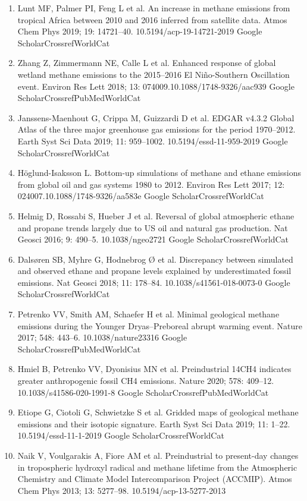 \documentclass[a4paper,12pt]{article}
\begin{document}
{\begin{thebibliography}{}
\begin{enumerate}
    Google ScholarCrossrefWorldCat 
    \item	Lunt MF, Palmer PI, Feng L et al.  An increase in methane emissions from tropical Africa between 2010 and 2016 inferred from satellite data. Atmos Chem Phys 2019; 19: 14721–40. 10.5194/acp-19-14721-2019
    Google ScholarCrossrefWorldCat 
    \item	Zhang Z, Zimmermann NE, Calle L et al.  Enhanced response of global wetland methane emissions to the 2015–2016 El Niño-Southern Oscillation event. Environ Res Lett 2018; 13: 074009.10.1088/1748-9326/aac939
    Google ScholarCrossrefPubMedWorldCat 
    \item	Janssens-Maenhout G, Crippa M, Guizzardi D et al.  EDGAR v4.3.2 Global Atlas of the three major greenhouse gas emissions for the period 1970–2012. Earth Syst Sci Data 2019; 11: 959–1002. 10.5194/essd-11-959-2019
    Google ScholarCrossrefWorldCat 
    \item	Höglund-Isaksson L. Bottom-up simulations of methane and ethane emissions from global oil and gas systems 1980 to 2012. Environ Res Lett 2017; 12: 024007.10.1088/1748-9326/aa583e
    Google ScholarCrossrefWorldCat 
    \item	Helmig D, Rossabi S, Hueber J et al.  Reversal of global atmospheric ethane and propane trends largely due to US oil and natural gas production. Nat Geosci 2016; 9: 490–5. 10.1038/ngeo2721
    Google ScholarCrossrefWorldCat 
    \item	Dalsøren SB, Myhre G, Hodnebrog Ø et al.  Discrepancy between simulated and observed ethane and propane levels explained by underestimated fossil emissions. Nat Geosci 2018; 11: 178–84. 10.1038/s41561-018-0073-0
    Google ScholarCrossrefWorldCat 
    \item	Petrenko VV, Smith AM, Schaefer H et al.  Minimal geological methane emissions during the Younger Dryas–Preboreal abrupt warming event. Nature 2017; 548: 443–6. 10.1038/nature23316
    Google ScholarCrossrefPubMedWorldCat 
    \item	Hmiel B, Petrenko VV, Dyonisius MN et al.  Preindustrial 14CH4 indicates greater anthropogenic fossil CH4 emissions. Nature 2020; 578: 409–12. 10.1038/s41586-020-1991-8
    Google ScholarCrossrefPubMedWorldCat 
    \item	Etiope G, Ciotoli G, Schwietzke S et al.  Gridded maps of geological methane emissions and their isotopic signature. Earth Syst Sci Data 2019; 11: 1–22. 10.5194/essd-11-1-2019
    Google ScholarCrossrefWorldCat 
    \item	Naik V, Voulgarakis A, Fiore AM et al.  Preindustrial to present-day changes in tropospheric hydroxyl radical and methane lifetime from the Atmospheric Chemistry and Climate Model Intercomparison Project (ACCMIP). Atmos Chem Phys 2013; 13: 5277–98. 10.5194/acp-13-5277-2013

\end{enumerate}
\end{thebibliography}}
\end{document}
